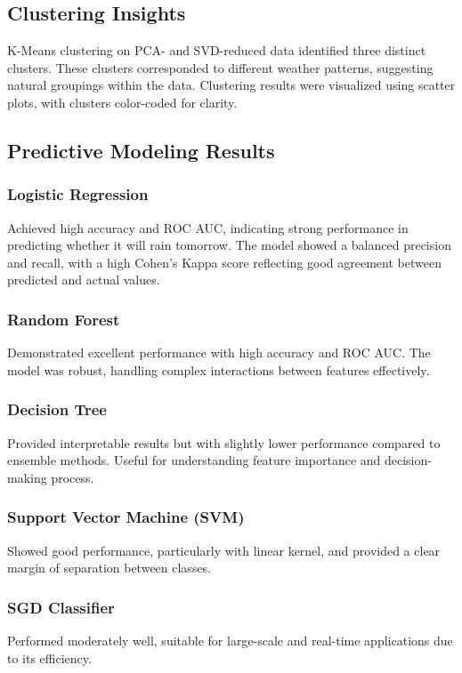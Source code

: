 \documentclass[12pt]{article}
\begin{document}
\subsection{Clustering Insights}
K-Means clustering on PCA- and SVD-reduced data identified three distinct clusters. These clusters corresponded to different weather patterns, suggesting natural groupings within the data. Clustering results were visualized using scatter plots, with clusters color-coded for clarity.

\subsection{Predictive Modeling Results}
\subsubsection{Logistic Regression}
Achieved high accuracy and ROC AUC, indicating strong performance in predicting whether it will rain tomorrow. The model showed a balanced precision and recall, with a high Cohen's Kappa score reflecting good agreement between predicted and actual values.

\subsubsection{Random Forest}
Demonstrated excellent performance with high accuracy and ROC AUC. The model was robust, handling complex interactions between features effectively.

\subsubsection{Decision Tree}
Provided interpretable results but with slightly lower performance compared to ensemble methods. Useful for understanding feature importance and decision-making process.

\subsubsection{Support Vector Machine (SVM)}
Showed good performance, particularly with linear kernel, and provided a clear margin of separation between classes.

\subsubsection{SGD Classifier}
Performed moderately well, suitable for large-scale and real-time applications due to its efficiency.
\end{document}
